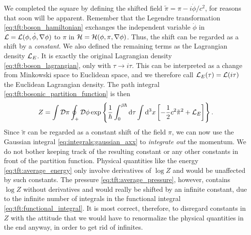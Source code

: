 We completed the square by defining the shifted field $\tilde\pi = \pi - i \dot\phi / c^2$, for reasons that soon will be apparent.
Remember that the Legendre transformation \eqref{eq:tft:boson_hamiltonian} exchanges the independent variable $\dot\phi$ in $\mathcal{L} = \mathcal{L}(\phi, \dot\phi, \nabla\phi)$ to $\pi$ in $\mathcal{H} = \mathcal{H}(\phi, \pi, \nabla\phi)$.
Thus, the shift can be regarded as a shift by a \emph{constant}.
We also defined the remaining terms as the Lagrangian density $\mathcal{L}_E$.
It is exactly the original Lagrangian density \eqref{eq:tft:boson_lagrangian}, only with $\tau \rightarrow i \tau$.
This can be interpreted as a change from Minkowski space to Euclidean space, and we therefore call $\mathcal{L}_E(\tau) = \mathcal{L}(i \tau)$ the Euclidean Lagrangian density.
The path integral \eqref{eq:tft:bosonic_partition_function} is then
\begin{equation}
	Z = \int \mathcal{D} \pi \oint_+ \mathcal{D} \phi \exp \left\{ \frac{1}{\hbar} \int_0^{\beta \hbar} \mathop{}\!\mathrm{d} \tau \int \mathop{}\!\mathrm{d}^3 x \left[ - \frac12 c^2 \tilde\pi^2 + \mathcal{L}_E \right] \right\} .
\label{eq:tft:boson_integrate_out_momentum}
\end{equation}
Since $\tilde\pi$ can be regarded as a constant shift of the field $\pi$, we can now use the Gaussian integral \eqref{eq:integrals:gaussian_axx} to \emph{integrate out} the momentum. 
We do not bother keeping track of the resulting constant or any other constants in front of the partition function.
Physical quantities like the energy \eqref{eq:tft:average_energy} only involve derivatives of $\log Z$ and would be unaffected by such constants.
The pressure \eqref{eq:tft:average_pressure}, however, contains $\log Z$ without derivatives and would really be shifted by an infinite constant, due to the infinite number of integrals in the functional integral \eqref{eq:tft:functional_integral}.
It is most correct, therefore, to disregard constants in $Z$ with the attitude that we would have to renormalize the physical quantities in the end anyway, in order to get rid of infinites.

